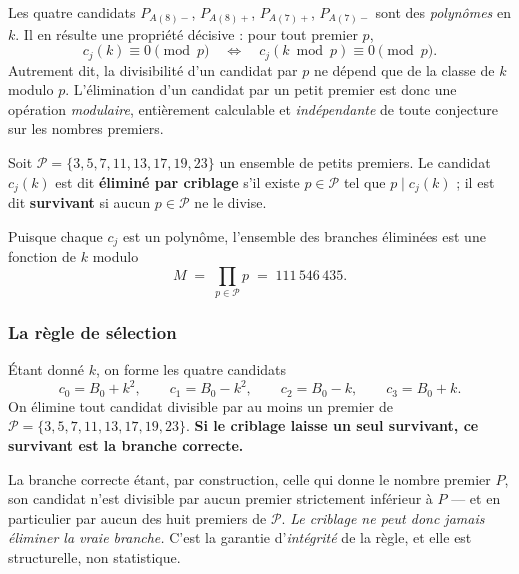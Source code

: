 \documentclass[11pt,a4paper]{article}
\begin{document}
Les quatre candidats $P_{A(8)-}$, $P_{A(8)+}$, $P_{A(7)+}$, $P_{A(7)-}$ sont des
\emph{polynômes} en $k$. Il en résulte une propriété décisive : pour
tout premier $p$,
\[
  c_j(k) \equiv 0 \!\!\pmod p
  \quad\Longleftrightarrow\quad
  c_j(k \bmod p) \equiv 0 \!\!\pmod p .
\]
Autrement dit, la divisibilité d'un candidat par $p$ ne dépend que de la
classe de $k$ modulo $p$. L'élimination d'un candidat par un petit
premier est donc une opération \emph{modulaire}, entièrement calculable
et \emph{indépendante} de toute conjecture sur les nombres premiers.

\vspace{0.3cm}
\begin{boiteformule}
Soit $\mathcal{P} = \{3,5,7,11,13,17,19,23\}$ un ensemble de petits
premiers. Le candidat $c_j(k)$ est dit \textbf{éliminé par criblage} s'il
existe $p \in \mathcal{P}$ tel que $p \mid c_j(k)$ ; il est dit
\textbf{survivant} si aucun $p \in \mathcal{P}$ ne le divise.
\end{boiteformule}

Puisque chaque $c_j$ est un polynôme, l'ensemble des branches éliminées
est une fonction de $k$ modulo
\[
  M \;=\; \prod_{p \in \mathcal{P}} p \;=\; 111\,546\,435 .
\]

\subsubsection{La règle de sélection}

\vspace{0.3cm}
\begin{boiteformule}
Étant donné $k$, on forme les quatre candidats
\[
  c_0 = B_0+k^{2},\qquad c_1 = B_0-k^{2},\qquad
  c_2 = B_0-k,\qquad c_3 = B_0+k .
\]
On élimine tout candidat divisible par au moins un premier de
$\mathcal{P} = \{3,5,7,11,13,17,19,23\}$. \textbf{Si le criblage laisse un
seul survivant, ce survivant est la branche correcte.}
\end{boiteformule}

\vspace{0.3cm}
\begin{boitenote}
La branche correcte étant, par construction, celle qui donne le
nombre premier $P$, son candidat n'est divisible par aucun premier
strictement inférieur à $P$ --- et en particulier par aucun des huit
premiers de $\mathcal{P}$. \emph{Le criblage ne peut donc jamais
éliminer la vraie branche.} C'est la garantie d'\emph{intégrité} de la
règle, et elle est structurelle, non statistique.
\end{boitenote}
\end{document}
